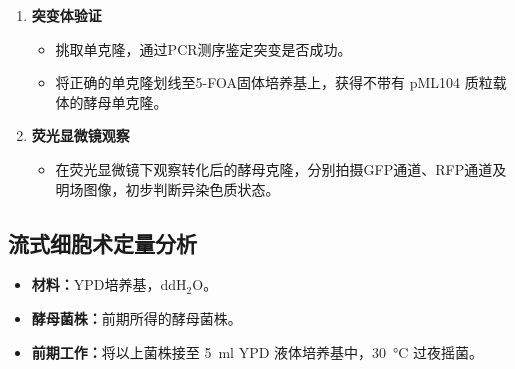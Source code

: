 \documentclass[a4,10pt]{article}
\begin{document}
\begin{enumerate}
    \item \textbf{突变体验证}
    \begin{itemize}
        \item 挑取单克隆，通过PCR测序鉴定突变是否成功。
        \item 将正确的单克隆划线至5-FOA固体培养基上，获得不带有 pML104 质粒载体的酵母单克隆。
    \end{itemize}
    
    \item \textbf{荧光显微镜观察}
    \begin{itemize}
        \item 在荧光显微镜下观察转化后的酵母克隆，分别拍摄GFP通道、RFP通道及明场图像，初步判断异染色质状态。
    \end{itemize}
\end{enumerate}

\subsection{流式细胞术定量分析}

\begin{itemize}
    \item \textbf{材料：}YPD培养基，ddH$_2$O。
    \item \textbf{酵母菌株：}前期所得的酵母菌株。
    \item \textbf{前期工作：}将以上菌株接至 \qty{5}{\ml} YPD 液体培养基中，\qty{30}{\celsius} 过夜摇菌。
\end{itemize}
\end{document}
